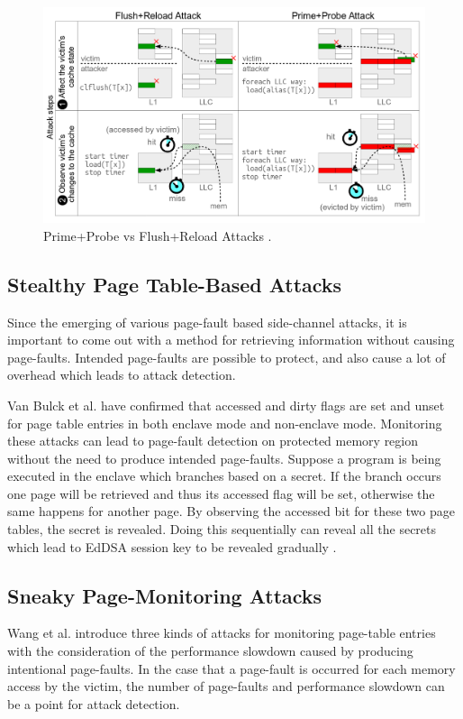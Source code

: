 \begin{figure}
	\includegraphics[scale=0.2]{images/ppfr}
	\caption{Prime+Probe vs Flush+Reload Attacks \cite{kayaalp2016high}.}
	\label{fig:ppfr}
\end{figure}

\subsection{Stealthy Page Table-Based Attacks}
Since the emerging of various page-fault based side-channel attacks, it is important to come out with a method for retrieving information without causing page-faults. Intended page-faults are possible to protect, and also cause a lot of overhead which leads to attack detection.

Van Bulck et al. \cite{stealthy} have confirmed that accessed and dirty flags are set and unset for page table entries in both enclave mode and non-enclave mode. Monitoring these attacks can lead to page-fault detection on protected memory region without the need to produce intended page-faults. Suppose a program is being executed in the enclave which branches based on a secret. If the branch occurs one page will be retrieved and thus its accessed flag will be set, otherwise the same happens for another page. By observing the accessed bit for these two page tables, the secret is revealed. Doing this sequentially can reveal all the secrets which lead to EdDSA session key to be revealed gradually \cite{stealthy}.


\subsection{Sneaky Page-Monitoring Attacks}
Wang et al. \cite{leakycauldron} introduce three kinds of attacks for monitoring page-table entries with the consideration of the performance slowdown caused by producing intentional page-faults. In the case that a page-fault is occurred for each memory access by the victim, the number of page-faults and performance slowdown can be a point for attack detection.
